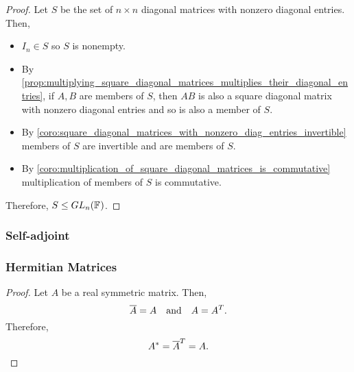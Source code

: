 \documentclass[../MathsNotesBase.tex]{subfiles}
\begin{document}
{		
		\bigskip
		\begin{proof}
			Let $S$ be the set of ${ n \times n }$ diagonal matrices with nonzero diagonal entries. Then,
			\begin{itemize}
				\item{${ I_n \in S }$ so $S$ is nonempty.}
				\item{By \autoref{prop:multiplying_square_diagonal_matrices_multiplies_their_diagonal_entries}, if $A,B$ are members of $S$, then $AB$ is also a square diagonal matrix with nonzero diagonal entries and so is also a member of $S$.}
				\item{By \ref{coro:square_diagonal_matrices_with_nonzero_diag_entries_invertible} members of $S$ are invertible and are members of $S$.}
				\item{By \ref{coro:multiplication_of_square_diagonal_matrices_is_commutative} multiplication of members of $S$ is commutative.}
			\end{itemize}
			Therefore, ${ S \leq GL_n(\mathbb{F}^{}) }$.
		\end{proof}
	
	
	
	
		\biggerskip
		\subsubsection{Self-adjoint}
	
	
		
		\biggerskip
		\subsubsection{Hermitian Matrices}
		\label{def:hermitian-matrix}
	
		\begin{proof}
			Let $A$ be a real symmetric matrix. Then,
			\[ \overline{A} = A \hspace{10pt}\text{and}\hspace{10pt} A = A^T. \]
			Therefore,
			\[ A^* = \overline{A}^T = A. \qedhere \]
		\end{proof}
	
}
\end{document}
